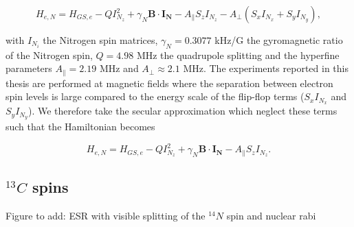 \begin{equation}
H_{e,N} = H_{GS,e} - Q I_{N_z}^2 + \gamma_N \mathbf{B} \cdot \mathbf{I_N} - A_{\parallel} S_z I_{N_z} - A_{\perp}(S_x I_{N_x}+S_y I_{N_y}),
\end{equation}

with $I_{N_i}$ the Nitrogen spin matrices, $\gamma_N = 0.3077$ kHz/G the gyromagnetic ratio of the Nitrogen spin, $Q = 4.98$ MHz the quadrupole splitting and the hyperfine parameters $A_{\parallel} = 2.19$ MHz and $A_{\perp} \approx 2.1$ MHz. The experiments reported in this thesis are performed at magnetic fields where the separation between electron spin levels is large compared to the energy scale of the flip-flop terms ($S_x I_{N_x}$ and $S_y I_{N_y}$). We therefore take the secular approximation which neglect these terms such that the Hamiltonian becomes

\begin{equation}
H_{e,N} = H_{GS,e} - Q I_{N_z}^2 + \gamma_N \mathbf{B} \cdot \mathbf{I_N} - A_{\parallel} S_z I_{N_z}.
\end{equation}



\subsection{$^{13}C$ spins}

Figure to add: ESR with visible splitting of the $^{14}N$ spin and nuclear rabi





\newpage




